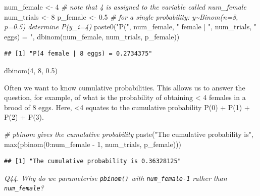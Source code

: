 \documentclass[
  11pt,
  a4paper,
]{book}
\newenvironment{Shaded}{\begin{snugshade}}{\end{snugshade}}
\newcommand{\CommentTok}[1]{\textcolor[rgb]{0.56,0.35,0.01}{\textit{#1}}}
\newcommand{\DecValTok}[1]{\textcolor[rgb]{0.00,0.00,0.81}{#1}}
\newcommand{\FloatTok}[1]{\textcolor[rgb]{0.00,0.00,0.81}{#1}}
\newcommand{\FunctionTok}[1]{\textcolor[rgb]{0.00,0.00,0.00}{#1}}
\newcommand{\NormalTok}[1]{#1}
\newcommand{\OtherTok}[1]{\textcolor[rgb]{0.56,0.35,0.01}{#1}}
\newcommand{\SpecialCharTok}[1]{\textcolor[rgb]{0.00,0.00,0.00}{#1}}
\newcommand{\StringTok}[1]{\textcolor[rgb]{0.31,0.60,0.02}{#1}}
\begin{document}
\begin{Shaded}
\begin{Highlighting}[]
\NormalTok{num\_female }\OtherTok{\textless{}{-}} \DecValTok{4} \CommentTok{\# note that 4 is assigned to the variable called num\_female}
\NormalTok{num\_trials }\OtherTok{\textless{}{-}} \DecValTok{8}
\NormalTok{p\_female }\OtherTok{\textless{}{-}} \FloatTok{0.5}
\CommentTok{\# for a single probability: y\textasciitilde{}Binom(n=8, p=0.5) determine P(y\_i=4)}
\FunctionTok{paste0}\NormalTok{(}\StringTok{"P("}\NormalTok{, num\_female, }\StringTok{" female | "}\NormalTok{, num\_trials, }\StringTok{" eggs) = "}\NormalTok{,}
       \FunctionTok{dbinom}\NormalTok{(num\_female, num\_trials, p\_female))}
\end{Highlighting}
\end{Shaded}

\begin{verbatim}
## [1] "P(4 female | 8 eggs) = 0.2734375"
\end{verbatim}

\begin{Shaded}
\begin{Highlighting}[]
\FunctionTok{dbinom}\NormalTok{(}\DecValTok{4}\NormalTok{, }\DecValTok{8}\NormalTok{, }\FloatTok{0.5}\NormalTok{)}
\end{Highlighting}
\end{Shaded}

Often we want to know cumulative probabilities. This allows us to answer the question, for example, of what is the probability of obtaining \textless{} 4 females in a brood of 8 eggs. Here, \textless4 equates to the cumulative probability P(0) + P(1) + P(2) + P(3).

\begin{Shaded}
\begin{Highlighting}[]
\CommentTok{\# pbinom gives the cumulative probability}
\FunctionTok{paste}\NormalTok{(}\StringTok{"The cumulative probability is"}\NormalTok{, }
      \FunctionTok{max}\NormalTok{(}\FunctionTok{pbinom}\NormalTok{(}\DecValTok{0}\SpecialCharTok{:}\NormalTok{num\_female }\SpecialCharTok{{-}} \DecValTok{1}\NormalTok{, num\_trials, p\_female)))}
\end{Highlighting}
\end{Shaded}

\begin{verbatim}
## [1] "The cumulative probability is 0.36328125"
\end{verbatim}

\emph{Q44. Why do we parameterise \texttt{pbinom()} with \texttt{num\_female-1} rather than \texttt{num\_female}?}
\end{document}
